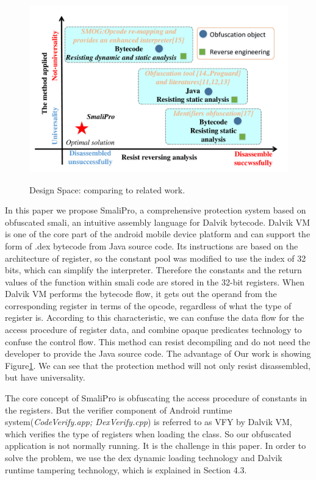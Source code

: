 \begin{figure}
  \centering
  \includegraphics[width=0.8\columnwidth]{fig/fig1.pdf}\\
  \caption{Design Space: comparing to related work.}\label{fig:Figure 1}
\end{figure}

In this paper we propose SmaliPro, a comprehensive protection system based on obfuscated smali, an intuitive assembly language for Dalvik bytecode. Dalvik VM is one of the core part of the android mobile device platform and can support the form of .dex bytecode from Java source code. Its instructions are based on the architecture of register, so the constant pool was modified to use the index of 32 bits, which can simplify the interpreter. Therefore the constants and the return values of the function within smali code are stored in the 32-bit registers. When Dalvik VM performs the bytecode flow, it gets out the operand from the corresponding register in terms of the opcode, regardless of what the type of register is. According to this characteristic, we can confuse the data flow for the access procedure of register data, and combine opaque predicates\cite{13,17,18} technology to confuse the control flow. This method can resist decompiling and do not need the developer to provide the Java source code. The advantage of Our work is showing Figure\ref{fig:Figure 1}. We can see that the protection method will not only resist disassembled, but have universality.

The core concept of SmaliPro is obfuscating the access procedure of constants in the registers. But the verifier component of Android runtime system(\emph{CodeVerify.app; DexVerify.cpp}) is referred to as VFY by Dalvik VM, which verifies the type of registers when loading the class. So our obfuscated application is not normally running. It is the challenge in this paper. In order to solve the problem, we use the dex dynamic loading technology and Dalvik runtime tampering technology, which is explained in Section 4.3.

